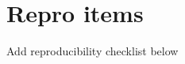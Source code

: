 \documentclass[preprint]{JASA}
\begin{document}
\hypertarget{repro-items}{%
\section{Repro items}\label{repro-items}}

Add reproducibility checklist below









\end{document}
